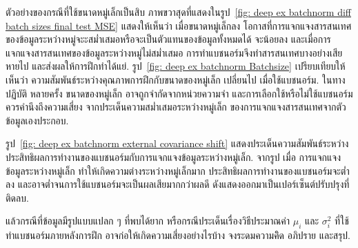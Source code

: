 \begin{Exercise}
ตัวอย่างของกรณีที่ใช้ขนาดหมู่เล็กเป็นสิบ
ภาพขวาสุดที่แสดงในรูป~\ref{fig: deep ex batchnorm diff batch sizes final test MSE}
แสดงให้เห็นว่า เมื่อขนาดหมู่เล็กลง โอกาสที่การแจกแจงสารสนเทศของข้อมูลระหว่างหมู่จะะสม่ำเสมอหรือจะเป็นตัวแทนของข้อมูลทั้งหมดได้ จะน้อยลง
และเมื่อการแจกแจงสารสนเทศของข้อมูลระหว่างหมู่ไม่สม่ำเสมอ การทำแบชนอร์มจึงทำสารสนเทศบางอย่างเสียหายไป
และส่งผลให้การฝึกทำได้แย่.
รูป~\ref{fig: deep ex batchnorm Batchsize}
เปรียบเทียบให้เห็นว่า
ความสัมพันธ์ระหว่างคุณภาพการฝึกกับขนาดของหมู่เล็ก
เปลี่ยนไป เมื่อใช้แบชนอร์ม.
ในทางปฏิบัติ หลายครั้ง 
ขนาดของหมู่เล็ก อาจถูกจำกัดจากหน่วยความจำ
และการเลือกใช้หรือไม่ใช้แบชนอร์ม 
ควรคำนึงถึงความเสี่ยง
จากประเด็นความสม่ำเสมอระหว่างหมู่เล็ก
ของการแจกแจงสารสนเทศจากตัวข้อมูลเองประกอบ.

รูป~\ref{fig: deep ex batchnorm external covariance shift}
แสดงประเด็นความสัมพันธ์ระหว่างประสิทธิผลการทำงานของแบชนอร์มกับการแจกแจงข้อมูลระหว่างหมู่เล็ก.
จากรูป
เมื่อ
การแจกแจงข้อมูลระหว่างหมู่เล็ก
ทำให้เกิดความต่างระหว่างหมู่เล็กมาก 
ประสิทธิผลการทำงานของแบชนอร์มจะต่ำลง
และอาจต่ำจนการใช้แบชนอร์มจะเป็นผลเสียมากกว่าผลดี
ดังแสดงออกมาเป็นเปอร์เซ็นต์ปรับปรุงที่ติดลบ.

แล้วกรณีที่ข้อมูลมีรูปแบบแปลก ๆ ที่พบได้ยาก
หรือกรณีประเด็นเรื่องวิธีประมาณค่า $\mu_i$ และ $\sigma_i^2$ ที่ใช้ทำแบชนอร์มภายหลังการฝึก
อาจก่อให้เกิดความเสี่ยงอย่างไรบ้าง
จงระดมความคิิด อภิปราย และสรุป. 

\end{Exercise}

